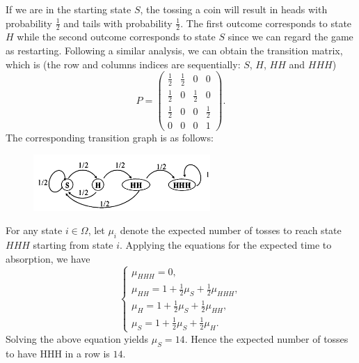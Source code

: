 \documentclass[12pt,letterpaper, onecolumn]{exam}
\begin{document}
\begin{questions}
\begin{solution}
\begin{parts}
                \quad If we are in the starting state $S$, the tossing a coin will result in heads with probability $\frac{1}{2}$ and tails with probability $\frac{1}{2}$. The first outcome corresponds to state $H$ while the second outcome corresponds to state $S$ since we can regard the game as restarting. Following a similar analysis, we can obtain the transition matrix, which is (the row and columns indices are sequentially: $S$, $H$, $HH$ and $HHH$)
                $$P=\begin{pmatrix}
                    \frac{1}{2}&\frac{1}{2}&0&0\\
                    \frac{1}{2}&0&\frac{1}{2}&0\\
                    \frac{1}{2}&0&0&\frac{1}{2}\\
                    0&0&0&1
                \end{pmatrix}.$$
                The corresponding transition graph is as follows:
                \begin{figure}[H]
                    \centering
                    \includegraphics[width=0.6\textwidth]{figures/fig-5.png}
                \end{figure}
                \quad For any state $i\in\Omega$, let $\mu_i$ denote the expected number of tosses to reach state $HHH$ starting from state $i$. Applying the equations for the expected time to absorption, we have 
                $$\begin{cases}
                    \mu_{HHH}=0,\\
                    \mu_{HH}=1+\frac{1}{2}\mu_{S}+\frac{1}{2}\mu_{HHH},\\
                    \mu_{H}=1+\frac{1}{2}\mu_{S}+\frac{1}{2}\mu_{HH},\\
                    \mu_{S}=1+\frac{1}{2}\mu_{S}+\frac{1}{2}\mu_{H}.
                \end{cases}$$
                Solving the above equation yields $\mu_S=14$. Hence the expected number of tosses to have HHH in a row is $14$.


\end{parts}
\end{solution}
\end{questions}
\end{document}
